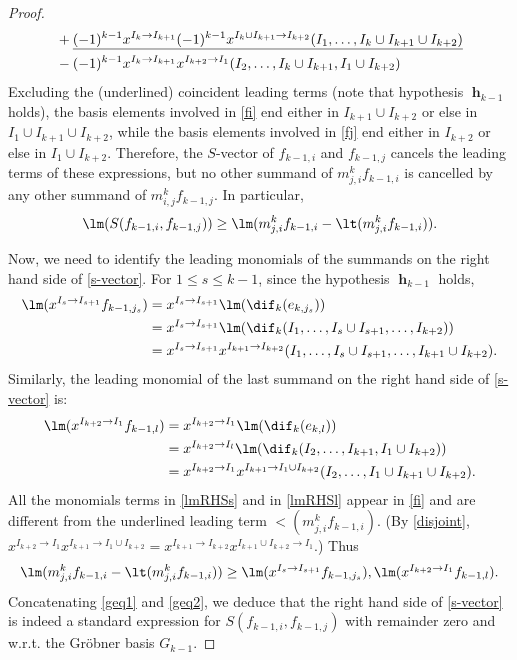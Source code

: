 \begin{proof}
\begin{align}
&+ \underline{(-1)^{k-1}x^{I_{k}\to
      I_{k+1}}(-1)^{k-1}x^{I_{k}\cup I_{k+1}\to I_{k+2}}(I_1,\ldots
    ,I_{k}\cup I_{k+1}\cup I_{k+2})} \notag \\
  &-(-1)^{k-1}x^{I_{k}\to I_{k+1}}x^{I_{k+2}\to
    I_1}(I_2,\ldots,I_{k}\cup I_{k+1},I_1\cup I_{k+2})\notag
\end{align}
Excluding the (underlined) coincident leading terms (note that
hypothesis $\mbfh_{k-1}$ holds), the basis elements involved in
\eqref{fi} end either in $I_{k+1}\cup I_{k+2}$ or else in $I_1\cup I_{k+1}\cup
I_{k+2}$, while the basis elements involved in \eqref{fj} end either
in $I_{k+2}$ or else in $I_1\cup I_{k+2}$. Therefore, the $S$-vector
of $f_{k-1,i}$ and $f_{k-1,j}$ cancels the leading terms of these
expressions, but no other summand of $m^{k}_{j,i}f_{k-1,i}$ is
cancelled by any other summand of $m^{k}_{i,j}f_{k-1,j}$.  In
particular,
\begin{eqnarray}\label{geq1}
\lm(S(f_{k-1,i},f_{k-1,j}))\geq
\lm(m^{k}_{j,i}f_{k-1,i}-\lt(m^{k}_{j,i}f_{k-1,i})).
\end{eqnarray}

Now, we need to identify the leading monomials of the summands on the
right hand side of \eqref{s-vector}. For $1\leq s\leq k-1$, since the
hypothesis $\mbfh_{k-1}$ holds,
\begin{align}\label{lmRHSs}
\lm(x^{I_s\to I_{s+1}}f_{k-1,j_s})&=x^{I_s\to
    I_{s+1}}\lm(\dif_{k}(e_{k,j_s}))\\
&= x^{I_s\to  I_{s+1}}\lm(\dif_{k}(I_1,\ldots ,I_s\cup I_{s+1},\ldots
  ,I_{k+2}))\notag \\ 
&= x^{I_s\to I_{s+1}}x^{I_{k+1}\to I_{k+2}}
  (I_1,\ldots ,I_s\cup I_{s+1},\ldots ,I_{k+1}\cup I_{k+2}). \notag
\end{align}
Similarly, the leading monomial of the last summand on the right hand
side of \eqref{s-vector} is:
\begin{align}\label{lmRHSl}
\lm(x^{I_{k+2}\to I_{1}}f_{k-1,l})&=x^{I_{k+2}\to
    I_{1}}\lm(\dif_{k}(e_{k,l}))\\
&= x^{I_{k+2}\to     I_{l}}\lm(\dif_{k}(I_2,\ldots ,I_{k+1}, I_{1}\cup I_{k+2}))
  \notag \\
&= x^{I_{k+2}\to I_{1}}x^{I_{k+1}\to I_1\cup I_{k+2}}
  (I_2,\ldots ,I_1\cup I_{k+1}\cup I_{k+2}). \notag
\end{align}
All the monomials terms in \eqref{lmRHSs} and in \eqref{lmRHSl} appear
in \eqref{fi} and are different from the underlined leading term
$\lt(m^{k}_{j,i}f_{k-1,i})$. (By \eqref{disjoint}, $x^{I_{k+2}\to
  I_1}x^{I_{k+1}\to I_1\cup I_{k+2}}=x^{I_{k+1}\to
  I_{k+2}}x^{I_{k+1}\cup I_{k+2}\to I_1}$.)  Thus
\begin{equation}\label{geq2}
\lm(m^{k}_{j,i}f_{k-1,i}-\lt(m^{k}_{j,i}f_{k-1,i}))\geq\lm(x^{I_s\to I_{s+1}}f_{k-1,j_s}),\lm(x^{I_{k+2}\to I_{1}}f_{k-1,l}).
\end{equation}
Concatenating \eqref{geq1} and \eqref{geq2}, we deduce that the right
hand side of \eqref{s-vector} is indeed a standard expression for
$S(f_{k-1,i},f_{k-1,j})$ with remainder zero and w.r.t. the Gr\"obner
basis $G_{k-1}$.


\end{proof}
